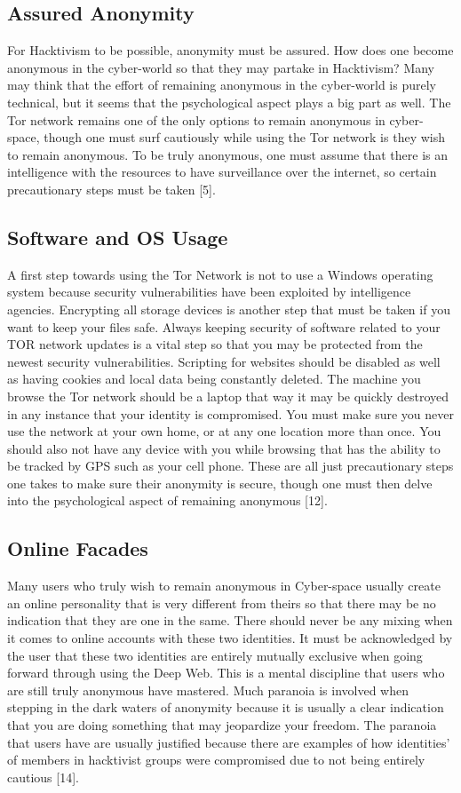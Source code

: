 \documentclass[twocolumn,letterpaper,10pt]{article}
\begin{document}
\subsection{Assured Anonymity}
For Hacktivism to be possible, anonymity must be assured. How does one become anonymous in the cyber-world so that they may partake in Hacktivism? Many may think that the effort of remaining anonymous in the cyber-world is purely technical, but it seems that the psychological aspect plays a big part as well. The Tor network remains one of the only options to remain anonymous in cyber-space, though one must surf cautiously while using the Tor network is they wish to remain anonymous. To be truly anonymous, one must assume that there is an intelligence with the resources to have surveillance over the internet, so certain precautionary steps must be taken [5].

\subsection{Software and OS Usage}
\indent A first step towards using the Tor Network is not to use a Windows operating system because security vulnerabilities have been exploited by intelligence agencies. Encrypting all storage devices is another step that must be taken if you want to keep your files safe. Always keeping security of software related to your TOR network updates is a vital step so that you may be protected from the newest security vulnerabilities. Scripting for websites should be disabled as well as having cookies and local data being constantly deleted. The machine you browse the Tor network should be a laptop that way it may be quickly destroyed in any instance that your identity is compromised. You must make sure you never use the network at your own home, or at any one location more than once. You should also not have any device with you while browsing that has the ability to be tracked by GPS such as your cell phone. These are all just precautionary steps one takes to make sure their anonymity is secure, though one must then delve into the psychological aspect of remaining anonymous [12].

\subsection{Online Facades}
\indent Many users who truly wish to remain anonymous in Cyber-space usually create an online personality that is very different from theirs so that there may be no indication that they are one in the same. There should never be any mixing when it comes to online accounts with these two identities. It must be acknowledged by the user that these two identities are entirely mutually exclusive when going forward through using the Deep Web. This is a mental discipline that users who are still truly anonymous have mastered. Much paranoia is involved when stepping in the dark waters of anonymity because it is usually a clear indication that you are doing something that may jeopardize your freedom. The paranoia that users have are usually justified because there are examples of how identities’ of members in hacktivist groups were compromised due to not being entirely cautious [14].
\end{document}
